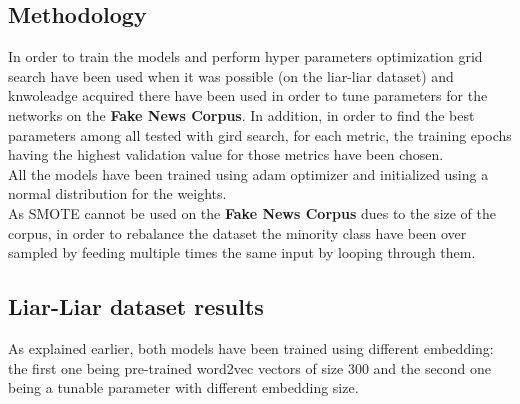 \subsection{Methodology}
In order to train the models and perform hyper parameters optimization grid search have been used when it was possible (on the liar-liar dataset) and knwoleadge acquired there have been used in order to tune parameters for the networks on the \textbf{Fake News Corpus}. In addition, in order to find the best parameters among all tested with gird search, for each metric, the training epochs having the highest validation value for those metrics have been chosen. \\
All the models have been trained using adam optimizer and initialized using a normal distribution for the weights. \\
As SMOTE cannot be used on the \textbf{Fake News Corpus} dues to the size of the corpus, in order to rebalance the dataset the minority class have been over sampled by feeding multiple times the same input by looping through them. 
\subsection{Liar-Liar dataset results}
As explained earlier, both models have been trained using different embedding: the first one being pre-trained word2vec vectors of size 300 and the second one being a tunable parameter with different embedding size.
